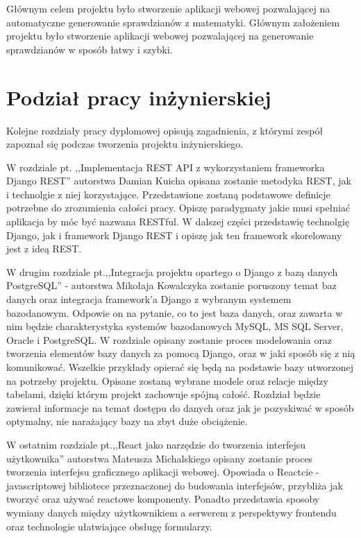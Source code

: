 \documentclass[oneside,polski,logo,indent]{amuthesis}
\begin{document}
Głównym celem projektu było stworzenie aplikacji webowej pozwalającej na automatyczne generowanie sprawdzianów z matematyki. Głównym założeniem projektu było stworzenie aplikacji webowej pozwalającej na generowanie sprawdzianów w sposób łatwy i szybki.  

\section{Podział pracy inżynierskiej}
 Kolejne rozdziały pracy dyplomowej opisują zagadnienia, z którymi zespół zapoznał się podczas tworzenia projektu inżynierskiego.

W rozdziale pt. ,,Implementacja REST API z wykorzystaniem frameworka Django REST'' autorstwa Damian Kuicha opisana zostanie metodyka REST, jak i technolgie z niej korzystające. Przedstawione zostaną podstawowe definicje potrzebne do zrozumienia całości pracy. Opiszę paradygmaty jakie musi spełniać aplikacja by móc być nazwana RESTful. W dalszej części przedstawię technolgię Django, jak i framework Django REST i opiszę jak ten framework skorelowany jest z ideą REST. 

 W drugim rozdziale pt.,,Integracja projektu opartego o Django z bazą danych PostgreSQL'' - autorstwa Mikołaja Kowalczyka zostanie poruszony temat baz danych oraz integracja framework’a Django z wybranym systemem bazodanowym. Odpowie on na pytanie, co to jest baza danych, oraz zawarta w nim będzie charakterystyka systemów bazodanowych MySQL, MS SQL Server, Oracle i PostgreSQL. W rozdziale opisany zostanie proces modelowania oraz tworzenia elementów bazy danych za pomocą Django, oraz w jaki sposób się z nią komunikować. Wszelkie przykłady opierać się będą na podstawie bazy utworzonej na potrzeby projektu. Opisane zostaną wybrane modele oraz relacje między tabelami, dzięki którym projekt zachowuje spójną całość. Rozdział będzie zawierał informacje na temat dostępu do danych oraz jak je pozyskiwać w sposób optymalny, nie narażający bazy na zbyt duże obciążenie.

W ostatnim rozdziale pt.,,React jako narzędzie do tworzenia interfejsu użytkownika'' autorstwa Mateusza Michalskiego opisany zostanie proces tworzenia interfejsu graficznego aplikacji webowej. Opowiada o Reactcie - javascriptowej bibliotece przeznaczonej do budowania interfejsów, przybliża jak tworzyć oraz używać reactowe komponenty. Ponadto przedstawia sposoby wymiany danych między użytkownikiem a serwerem z perspektywy frontendu oraz technologie ułatwiające obsługę formularzy.
\end{document}
